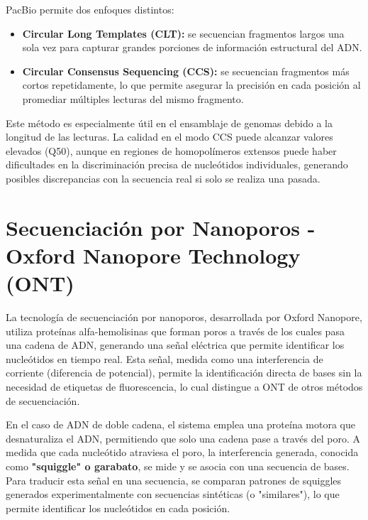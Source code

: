 PacBio permite dos enfoques distintos:
\begin{itemize}
\item \textbf{Circular Long Templates (CLT):} se secuencian fragmentos largos una sola vez para capturar grandes porciones de información estructural del ADN.
\item \textbf{Circular Consensus Sequencing (CCS):} se secuencian fragmentos más cortos repetidamente, lo que permite asegurar la precisión en cada posición al promediar múltiples lecturas del mismo fragmento.
\end{itemize}

Este método es especialmente útil en el ensamblaje de genomas debido a la longitud de las lecturas. La calidad en el modo CCS puede alcanzar valores elevados (Q50), aunque en regiones de homopolímeros extensos puede haber dificultades en la discriminación precisa de nucleótidos individuales, generando posibles discrepancias con la secuencia real si solo se realiza una pasada.

\section{Secuenciación por Nanoporos - Oxford Nanopore Technology (ONT)}
La tecnología de secuenciación por nanoporos, desarrollada por Oxford Nanopore, utiliza proteínas alfa-hemolisinas que forman poros a través de los cuales pasa una cadena de ADN, generando una señal eléctrica que permite identificar los nucleótidos en tiempo real. Esta señal, medida como una interferencia de corriente (diferencia de potencial), permite la identificación directa de bases sin la necesidad de etiquetas de fluorescencia, lo cual distingue a ONT de otros métodos de secuenciación.

En el caso de ADN de doble cadena, el sistema emplea una proteína motora que desnaturaliza el ADN, permitiendo que solo una cadena pase a través del poro. A medida que cada nucleótido atraviesa el poro, la interferencia generada, conocida como \textbf{"squiggle" o garabato}, se mide y se asocia con una secuencia de bases. Para traducir esta señal en una secuencia, se comparan patrones de squiggles generados experimentalmente con secuencias sintéticas (o "similares"), lo que permite identificar los nucleótidos en cada posición.

